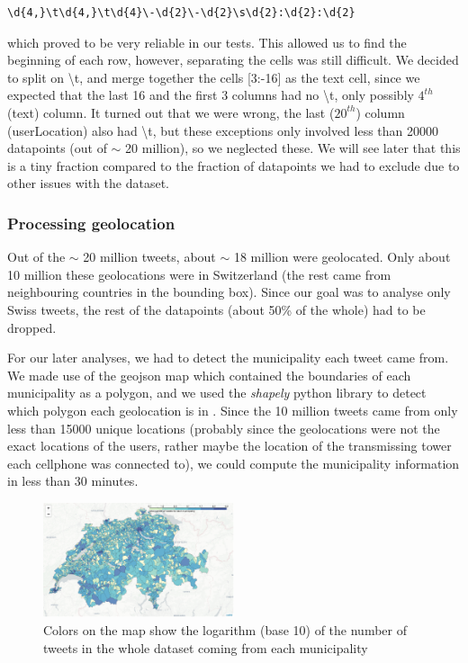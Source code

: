 \begin{Verbatim}[frame=single,fontsize=\scriptsize]
  \d{4,}\t\d{4,}\t\d{4}\-\d{2}\-\d{2}\s\d{2}:\d{2}:\d{2}
\end{Verbatim}

which proved to be very reliable in our tests. This allowed us to find the beginning of each row, however, separating the cells was still difficult. We decided to split on \textbackslash t, and merge together the cells [3:-16] as the text cell, since we expected that the last 16 and the first 3 columns had no \textbackslash t, only possibly $4^{th}$ (text) column. It turned out that we were wrong, the last ($20^{th}$) column (userLocation) also had \textbackslash t, but these exceptions only involved less than 20000 datapoints (out of $\sim$ 20 million), so we neglected these. We will see later that this is a tiny fraction compared to the fraction of datapoints we had to exclude due to other issues with the dataset.

\subsubsection{Processing geolocation}
\label{pre_geo}

Out of the $\sim$ 20 million tweets, about $\sim$ 18 million were geolocated. Only about 10 million these geolocations were in Switzerland (the rest came from neighbouring countries in the bounding box). Since our goal was to analyse only Swiss tweets, the rest of the datapoints (about 50\% of the whole) had to be dropped.

For our later analyses, we had to detect the municipality each tweet came from. We made use of the geojson map which contained the boundaries of each  municipality as a polygon, and we used the \textit{shapely} python library to detect which polygon each geolocation is in \cite{shapely}. Since the 10 million tweets came from only less than 15000 unique locations (probably since the geolocations were not the exact locations of the users, rather maybe the location of the transmissing tower each cellphone was connected to), we could compute the municipality information in less than 30 minutes.

\begin{figure}[h]
  \includegraphics[width=0.5\textwidth]{images/all_tweet_map.png}
  \caption{Colors on the map show the logarithm (base 10) of the number of tweets in the whole dataset coming from each municipality}
  \label{all_tweet_map}
\end{figure}


